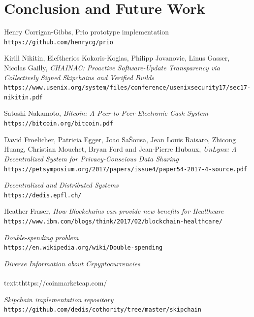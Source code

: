 \documentclass{article}
\begin{document}
\section{Conclusion and Future Work}
\begin{thebibliography}{9}
Henry Corrigan-Gibbs, Prio prototype implementation\\
\texttt{https://github.com/henrycg/prio}

Kirill Nikitin, Eleftherios Kokoris-Kogias, Philipp Jovanovic, Linus Gasser, Nicolas Gailly, \textit{CHAINAC: Proactive Software-Update Transparency via Collectively Signed Skipchains and Verified Builds}\\
\texttt{https://www.usenix.org/system/files/conference/usenixsecurity17/sec17-nikitin.pdf}


Satoshi Nakamoto, \textit{Bitcoin: A Peer-to-Peer Electronic Cash System}\\
\texttt{https://bitcoin.org/bitcoin.pdf}

David Froelicher, Patricia Egger, Joao Sa\' Sousa, Jean Louis Raisaro, Zhicong Huang, Christian Mouchet, Bryan Ford and Jean-Pierre Hubaux, \textit{UnLynx: A Decentralized System for Privacy-Conscious Data Sharing}\\
\texttt{https://petsymposium.org/2017/papers/issue4/paper54-2017-4-source.pdf}

\textit{Decentralized and Distributed Systems}\\
\texttt{https://dedis.epfl.ch/}

Heather Fraser, \textit{How Blockchains can provide new benefits for Healthcare}\\
\texttt{https://www.ibm.com/blogs/think/2017/02/blockchain-healthcare/}

\textit{Double-spending problem}\\
\texttt{https://en.wikipedia.org/wiki/Double-spending}

\textit{Diverse Information about Crpyptocurrencies}\\
\\texttt{https://coinmarketcap.com/}

\textit{Skipchain implementation repository}\\
\texttt{https://github.com/dedis/cothority/tree/master/skipchain}

\end{thebibliography}
\end{document}

